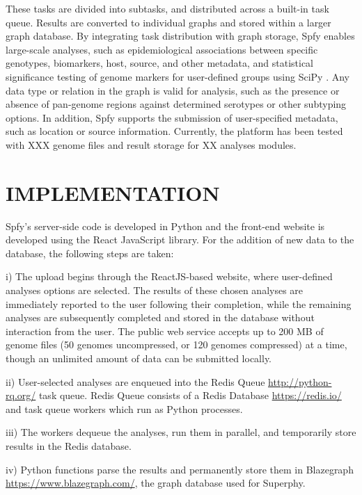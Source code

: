 \documentclass{article}
\begin{document}
These tasks are divided into subtasks, and distributed across a built-in task queue. Results are converted to individual graphs and stored within a larger graph database. By integrating task distribution with graph storage, Spfy enables large-scale analyses, such as epidemiological associations between specific genotypes, biomarkers, host, source, and other metadata, and statistical significance testing of genome markers for user-defined groups using SciPy \cite{jones2014scipy}. Any data type or relation in the graph is valid for analysis, such as the presence or absence of pan-genome regions against determined serotypes or other subtyping options. In addition, Spfy supports the submission of user-specified metadata, such as location or source information. Currently, the platform has been tested with XXX genome files and result storage for XX analyses modules.


\section{IMPLEMENTATION}
Spfy's server-side code is developed in Python and the front-end website is developed using the React JavaScript library. For the addition of new data to the database, the following steps are taken:

i) The upload begins through the ReactJS-based website, where user-defined analyses options are selected. The results of these chosen analyses are immediately reported to the user following their completion, while the remaining analyses are subsequently completed and stored in the database without interaction from the user. The public web service accepts up to 200 MB of genome files (50 genomes uncompressed, or 120 genomes compressed) at a time, though an unlimited amount of data can be submitted locally.

ii) User-selected analyses are enqueued into the Redis Queue \url{http://python-rq.org/} task queue. Redis Queue consists of a Redis Database \url{https://redis.io/} and task queue workers which run as Python processes.

iii) The workers dequeue the analyses, run them in parallel, and temporarily store results in the Redis database.

iv) Python functions parse the results and permanently store them in Blazegraph \url{https://www.blazegraph.com/}, the graph database used for Superphy.
\end{document}
